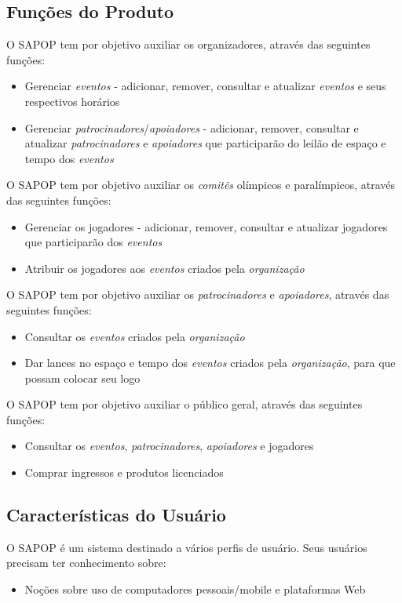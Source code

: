 \documentclass[
10pt, %
a4paper, %
oneside, %
headinclude,footinclude, %
BCOR5mm, %
]{scrartcl}
\begin{document}
\subsection{Funções do Produto}
O SAPOP tem por objetivo auxiliar os organizadores, através das seguintes funções:
\begin{itemize}[noitemsep]
	\item Gerenciar \textit{eventos} - adicionar, remover, consultar e atualizar \textit{eventos} e seus respectivos horários
	\item Gerenciar \textit{patrocinadores}/\textit{apoiadores} - adicionar, remover, consultar e atualizar \textit{patrocinadores} e \textit{apoiadores} que participarão do leilão de espaço e tempo dos \textit{eventos}
\end{itemize}
O SAPOP tem por objetivo auxiliar os \textit{comitês} olímpicos e paralímpicos, através das seguintes funções:
\begin{itemize}[noitemsep]
	\item Gerenciar os jogadores - adicionar, remover, consultar e atualizar jogadores que participarão dos \textit{eventos}
	\item Atribuir os jogadores aos \textit{eventos} criados pela \textit{organização}
\end{itemize}
O SAPOP tem por objetivo auxiliar os \textit{patrocinadores} e \textit{apoiadores}, através das seguintes funções:
\begin{itemize}[noitemsep]
	\item Consultar os \textit{eventos} criados pela \textit{organização}
	\item Dar lances no espaço e tempo dos \textit{eventos} criados pela \textit{organização}, para que possam colocar seu logo
\end{itemize}
O SAPOP tem por objetivo auxiliar o público geral, através das seguintes funções:
\begin{itemize}[noitemsep]
	\item Consultar os \textit{eventos}, \textit{patrocinadores}, \textit{apoiadores} e jogadores
	\item Comprar ingressos e produtos licenciados
\end{itemize}

\subsection{Características do Usuário}
O SAPOP é um sistema destinado a vários perfis de usuário. Seus usuários precisam ter conhecimento sobre:
\begin{itemize}[noitemsep]
	\item Noções sobre uso de computadores pessoais/mobile e plataformas Web
\end{itemize}
\end{document}
